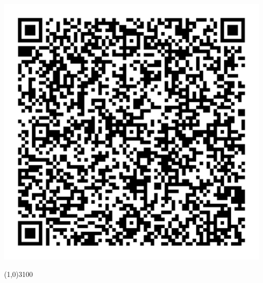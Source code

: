 \documentclass[a0,landscape,spanish,20pt]{a0poster}
\begin{document}
\begin{minipage}[b]{1\linewidth}
\begin{minipage}{0.8\linewidth}
\begin{shaded}
\end{shaded}
\end{minipage}
\begin{minipage}{0.08\linewidth}
\centering
\includegraphics[width=1\columnwidth]{figures/qrcode.jpg}
\end{minipage}


\end{minipage}

\line(1,0){3100}

%


\end{document}
